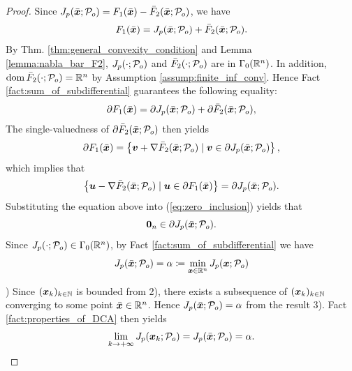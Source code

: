 \documentclass[lettersize,journal]{IEEEtran}
\theoremstyle{plain}%
\theoremstyle{definition}
\theoremstyle{remark}
\begin{document}
\begin{proof}
Since $J_{p}(\bar{\bm{x}};\mathcal{P}_o)=F_1(\bar{\bm{x}})-\bar{F}_2(\bar{\bm{x}};\mathcal{P}_o)$, we have 
\begin{equation*}
F_1(\bar{\bm{x}})=J_{p}(\bar{\bm{x}};\mathcal{P}_o)+\bar{F}_2(\bar{\bm{x}};\mathcal{P}_o).
\end{equation*}
By Thm. \ref{thm:general_convexity_condition} and Lemma \ref{lemma:nabla_bar_F2}, $J_{p}(\cdot;\mathcal{P}_o)$ and $\bar{F}_2(\cdot;\mathcal{P}_o)$ are in $\Gamma_0(\mathbb{R}^n)$. In addition, $\textrm{dom\,}{\bar{F}_2(\cdot;\mathcal{P}_o)}=\mathbb{R}^n$ by Assumption \ref{assump:finite_inf_conv}. Hence Fact \ref{fact:sum_of_subdifferential} guarantees the following equality:
\begin{equation*}
\partial F_1(\bar{\bm{x}})=\partial J_{p}(\bar{\bm{x}};\mathcal{P}_o)+\partial \bar{F}_2(\bar{\bm{x}};\mathcal{P}_o),
\end{equation*}
The single-valuedness of $\partial \bar{F}_2(\bar{\bm{x}};\mathcal{P}_o)$ then yields
\begin{equation*}
\partial F_1(\bar{\bm{x}})=\left\{ \bm{v}+\nabla \bar{F}_2(\bar{\bm{x}};\mathcal{P}_o) \mid \bm{v}\in\partial J_{p}(\bar{\bm{x}};\mathcal{P}_o) \right\},
\end{equation*}
which implies that
\begin{equation*}
\left\{ \bm{u}-\nabla\bar{F}_2(\bar{\bm{x}};\mathcal{P}_o)\mid \bm{u}\in\partial F_1(\bar{\bm{x}}) \right\}=\partial J_{p}(\bar{\bm{x}};\mathcal{P}_o).
\end{equation*}
Substituting the equation above into (\ref{eq:zero_inclusion}) yields that
\begin{equation*}
\mathbf{0}_n\in\partial J_{p}(\bar{\bm{x}};\mathcal{P}_o).
\end{equation*}
Since $J_{p}(\cdot;\mathcal{P}_o)\in\Gamma_0(\mathbb{R}^n)$, by Fact \ref{fact:sum_of_subdifferential} we have
\begin{equation*}
J_{p}(\bar{\bm{x}};\mathcal{P}_o)=\alpha\coloneqq \min_{\bm{x}\in\mathbb{R}^n} J_{p}(\bm{x};\mathcal{P}_o)
\end{equation*}

) Since $(\bm{x}_k)_{k\in\mathbb{N}}$ is bounded from 2), there exists a subsequence of $(\bm{x}_{k})_{k\in\mathbb{N}}$ converging to some point $\bar{\bm{x}}\in\mathbb{R}^n$. Hence $J_{p}(\bar{\bm{x}};\mathcal{P}_o)=\alpha$ from the result 3). Fact \ref{fact:properties_of_DCA} then yields
\begin{equation*}
\lim_{k\to +\infty} J_{p}(\bm{x}_k;\mathcal{P}_o)=J_{p}(\bar{\bm{x}};\mathcal{P}_o)=\alpha. \qedhere
\end{equation*}
\end{proof}



\end{document}
